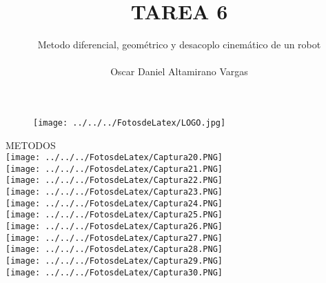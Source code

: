 \documentclass[12pt]{article}
\title{TAREA 6}
\author{Metodo diferencial, geométrico y desacoplo cinemático de un robot  \\ \\ Oscar Daniel Altamirano Vargas\\}
\begin{document}
 
\maketitle
\begin{figure}[hbtp]
\centering
\texttt{[image: ../../../FotosdeLatex/LOGO.jpg]}
\end{figure}
\pagebreak
METODOS\cite{ocw.ehu.eus2015}\\
\texttt{[image: ../../../FotosdeLatex/Captura20.PNG]} \\
\texttt{[image: ../../../FotosdeLatex/Captura21.PNG]} \\
\texttt{[image: ../../../FotosdeLatex/Captura22.PNG]} \\
\texttt{[image: ../../../FotosdeLatex/Captura23.PNG]} \\
\texttt{[image: ../../../FotosdeLatex/Captura24.PNG]} \\
\texttt{[image: ../../../FotosdeLatex/Captura25.PNG]} \\
\texttt{[image: ../../../FotosdeLatex/Captura26.PNG]} \\
\texttt{[image: ../../../FotosdeLatex/Captura27.PNG]} \\
\texttt{[image: ../../../FotosdeLatex/Captura28.PNG]} \\
\texttt{[image: ../../../FotosdeLatex/Captura29.PNG]}  \\
\texttt{[image: ../../../FotosdeLatex/Captura30.PNG]} \\
\pagebreak
\nocite{*} 


\end{document}
